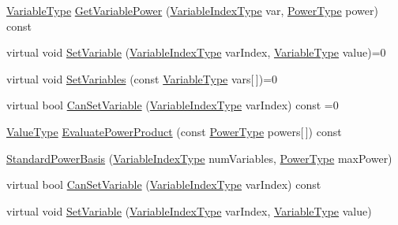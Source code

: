 \begin{DoxyCompactItemize}
\item 
\hyperlink{classnmr_multi_variable_power_basis_a7089007a79cce8d2eb3672e2d61af06c}{Variable\+Type} \hyperlink{classnmr_multi_variable_power_basis_a88d13668e5bfc554ab80c5eef901bf25}{Get\+Variable\+Power} (\hyperlink{classnmr_multi_variable_power_basis_ae125326a623043fcfd020aeeefd1cce6}{Variable\+Index\+Type} var, \hyperlink{classnmr_multi_variable_power_basis_a2cb67df83e9fcac213848fa7a7295fcc}{Power\+Type} power) const 
\item 
virtual void \hyperlink{classnmr_multi_variable_power_basis_a6725bd03e0272877f0737187345aab6d}{Set\+Variable} (\hyperlink{classnmr_multi_variable_power_basis_ae125326a623043fcfd020aeeefd1cce6}{Variable\+Index\+Type} var\+Index, \hyperlink{classnmr_multi_variable_power_basis_a7089007a79cce8d2eb3672e2d61af06c}{Variable\+Type} value)=0
\item 
virtual void \hyperlink{classnmr_multi_variable_power_basis_a250029c052022602969689861c94a5c2}{Set\+Variables} (const \hyperlink{classnmr_multi_variable_power_basis_a7089007a79cce8d2eb3672e2d61af06c}{Variable\+Type} vars\mbox{[}$\,$\mbox{]})=0
\item 
virtual bool \hyperlink{classnmr_multi_variable_power_basis_a0daa96cef75af539771b7033b3b7ab05}{Can\+Set\+Variable} (\hyperlink{classnmr_multi_variable_power_basis_ae125326a623043fcfd020aeeefd1cce6}{Variable\+Index\+Type} var\+Index) const =0
\item 
\hyperlink{classnmr_multi_variable_power_basis_af4a74a68c8bac235645e3f37f2f464e5}{Value\+Type} \hyperlink{classnmr_multi_variable_power_basis_a740a38e7dab7a1c80050293595424d69}{Evaluate\+Power\+Product} (const \hyperlink{classnmr_multi_variable_power_basis_a2cb67df83e9fcac213848fa7a7295fcc}{Power\+Type} powers\mbox{[}$\,$\mbox{]}) const 
\item 
\hyperlink{classnmr_multi_variable_power_basis_a7aea4d2b9847560899648720ee61b988}{Standard\+Power\+Basis} (\hyperlink{classnmr_multi_variable_power_basis_ae125326a623043fcfd020aeeefd1cce6}{Variable\+Index\+Type} num\+Variables, \hyperlink{classnmr_multi_variable_power_basis_a2cb67df83e9fcac213848fa7a7295fcc}{Power\+Type} max\+Power)
\item 
virtual bool \hyperlink{classnmr_multi_variable_power_basis_abcaeac7c3a176d67ff36be3cabd12de1}{Can\+Set\+Variable} (\hyperlink{classnmr_multi_variable_power_basis_ae125326a623043fcfd020aeeefd1cce6}{Variable\+Index\+Type} var\+Index) const 
\item 
virtual void \hyperlink{classnmr_multi_variable_power_basis_a9e01a0a65e51201f44851c34a68fdd59}{Set\+Variable} (\hyperlink{classnmr_multi_variable_power_basis_ae125326a623043fcfd020aeeefd1cce6}{Variable\+Index\+Type} var\+Index, \hyperlink{classnmr_multi_variable_power_basis_a7089007a79cce8d2eb3672e2d61af06c}{Variable\+Type} value)

\end{DoxyCompactItemize}
